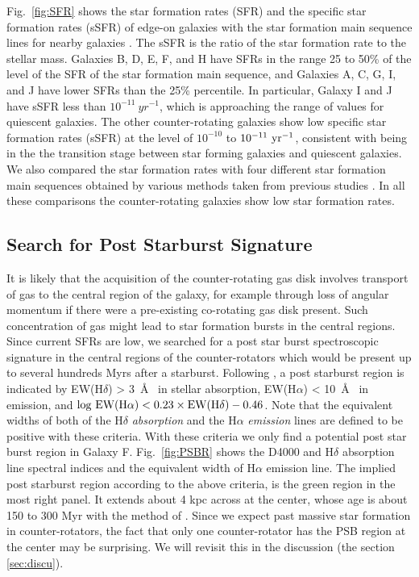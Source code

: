 \documentclass[fleqn,usenatbib]{mnras}
\begin{document}
Fig.~\ref{fig:SFR} shows the star formation rates (SFR) 
and the specific star formation rates (sSFR) of edge-on galaxies 
with the star formation main sequence lines for nearby galaxies \citep{Davies2016}.
The sSFR is the ratio of the star formation rate to the stellar mass.
Galaxies B, D, E, F, and H have SFRs in the range 
25 to 50\% of the level of the SFR of the star formation main sequence, and 
Galaxies A, C, G, I, and J have lower SFRs than the 25\% percentile.
In particular, Galaxy I and J have sSFR less than $10^{-11}~yr^{-1}$,
which is approaching the range of values for quiescent galaxies.
The other counter-rotating galaxies
show low specific star formation rates (sSFR) 
at the level of $10^{-10}$ to $\rm 10^{-11}~yr^{-1}$, 
consistent with being in the the transition stage 
between star forming galaxies and quiescent galaxies.
We also compared the star formation rates 
with four different star formation main sequences 
obtained by various methods taken from previous studies \citep{Davies2016,Jarrett2017}.
In all these comparisons 
the counter-rotating galaxies show low star formation rates.


\subsection{Search for Post Starburst Signature} \label{sec:PSBR}

It is likely that the acquisition of the counter-rotating gas disk involves transport of gas to the central region of the galaxy, for example through loss of angular momentum if there were a pre-existing co-rotating gas disk present. Such concentration of gas might lead to star formation bursts in the central regions. 
Since current SFRs are low, we searched for a post star burst spectroscopic signature 
in the central regions of the counter-rotators which would be present up to several hundreds Myrs after a starburst.
Following \citet{Chen2019}, a post starburst region is indicated by 
EW(H$\delta$) > 3~\AA~ in stellar absorption, 
EW(H$\alpha$) < 10~\AA~ in emission,
and $\rm log~EW(H\alpha) < 0.23 \times EW(H\delta) - 0.46$.
Note that the equivalent widths of both of the H$\delta$ {\it absorption} 
and the H$\alpha$ {\it emission} lines
are defined to be positive with these criteria. 
With these criteria we only find a potential post star burst region in Galaxy F.
Fig.~\ref{fig:PSBR} shows the D4000 and H$\delta$ absorption line spectral indices and the equivalent width of H$\alpha$ emission line.
The implied post starburst region according to the above criteria,
is the green region in the most right panel. 
It extends about 4 kpc across at the center,
whose age is about 150 to 300 Myr with the method of \citet{Chen2019}.
Since we expect past massive star formation in counter-rotators, 
the fact that only one counter-rotator has the PSB region at the center
may be surprising. 
We will revisit this in the discussion (the section \ref{sec:discu}).
\end{document}
